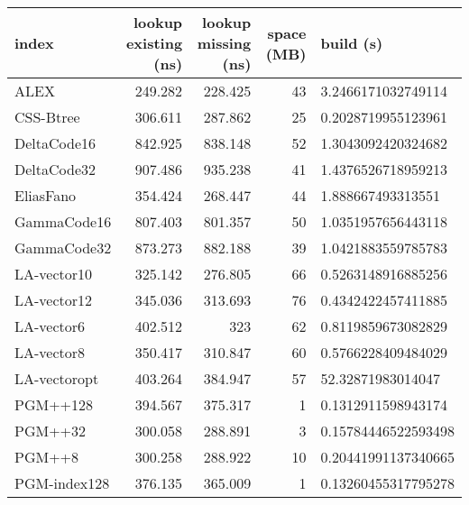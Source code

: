 \begin{tabular}{lrrrl}
\hline
 index             &   lookup existing (ns) &   lookup missing (ns) &   space (MB) & build (s)             \\
\hline
 ALEX              &                249.282 &               228.425 &           43 & 3.2466171032749114    \\
 CSS-Btree         &                306.611 &               287.862 &           25 & 0.2028719955123961    \\
 DeltaCode16       &                842.925 &               838.148 &           52 & 1.3043092420324682    \\
 DeltaCode32       &                907.486 &               935.238 &           41 & 1.4376526718959213    \\
 EliasFano         &                354.424 &               268.447 &           44 & 1.888667493313551     \\
 GammaCode16       &                807.403 &               801.357 &           50 & 1.0351957656443118    \\
 GammaCode32       &                873.273 &               882.188 &           39 & 1.0421883559785783    \\
 LA-vector10       &                325.142 &               276.805 &           66 & 0.5263148916885256    \\
 LA-vector12       &                345.036 &               313.693 &           76 & 0.4342422457411885    \\
 LA-vector6        &                402.512 &               323     &           62 & 0.8119859673082829    \\
 LA-vector8        &                350.417 &               310.847 &           60 & 0.5766228409484029    \\
 LA-vectoropt      &                403.264 &               384.947 &           57 & 52.32871983014047     \\
 PGM++128          &                394.567 &               375.317 &            1 & 0.1312911598943174    \\
 PGM++32           &                300.058 &               288.891 &            3 & 0.15784446522593498   \\
 PGM++8            &                300.258 &               288.922 &           10 & 0.20441991137340665   \\
 PGM-index128      &                376.135 &               365.009 &            1 & 0.13260455317795278   \\

\end{tabular}
